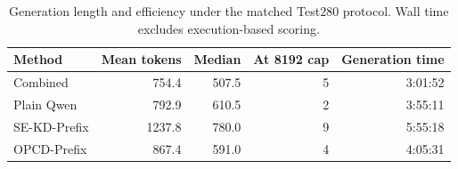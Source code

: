 \begin{table}[t]
  \centering
  \small
  \caption{Generation length and efficiency under the matched Test280
  protocol. Wall time excludes execution-based scoring.}
  \label{tab:official-prefix-efficiency}
  \begin{tabular}{lrrrr}
    \toprule
    Method & Mean tokens & Median & At 8192 cap & Generation time \\
    \midrule
    Combined & 754.4 & 507.5 & 5 & 3:01:52 \\
    Plain Qwen & 792.9 & 610.5 & 2 & 3:55:11 \\
    SE-KD-Prefix & 1237.8 & 780.0 & 9 & 5:55:18 \\
    OPCD-Prefix & 867.4 & 591.0 & 4 & 4:05:31 \\
    \bottomrule
  \end{tabular}
\end{table}
